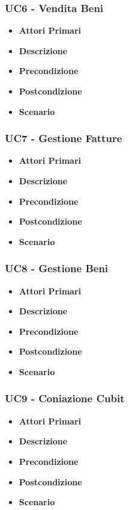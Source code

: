 \subsubsection{UC6 - Vendita Beni}
\begin{itemize}
	\item \textbf{Attori Primari}
	\item \textbf{Descrizione}
	\item \textbf{Precondizione}
	\item \textbf{Postcondizione}
	\item \textbf{Scenario}
\end{itemize}
\subsubsection{UC7 - Gestione Fatture}
\begin{itemize}
	\item \textbf{Attori Primari}
	\item \textbf{Descrizione}
	\item \textbf{Precondizione}
	\item \textbf{Postcondizione}
	\item \textbf{Scenario}
\end{itemize}
\subsubsection{UC8 - Gestione Beni}
\begin{itemize}
	\item \textbf{Attori Primari}
	\item \textbf{Descrizione}
	\item \textbf{Precondizione}
	\item \textbf{Postcondizione}
	\item \textbf{Scenario}
\end{itemize}
\subsubsection{UC9 -  Coniazione Cubit}
\begin{itemize}
	\item \textbf{Attori Primari}
	\item \textbf{Descrizione}
	\item \textbf{Precondizione}
	\item \textbf{Postcondizione}
	\item \textbf{Scenario}
\end{itemize}
